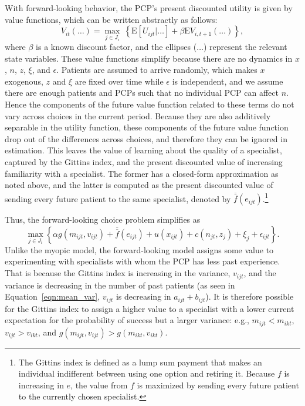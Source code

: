 \documentclass[12pt]{article}
\begin{document}
With forward-looking behavior, the PCP's present discounted utility is given by value functions, which can be written abstractly as follows:
\begin{equation*}
V_{it}(\dots) = \max_{j \in J_i} \ \left\{ \mathrm{E} \left[ U_{ijt} | \dots \right]
+ \beta \mathrm{E} V_{i, t+1}(\dots) \right\},
\end{equation*}
where $\beta$ is a known discount factor, and the ellipses ($\dots$) represent the relevant state variables. These value functions simplify because there are no dynamics in $x$, $n$, $z$, $\xi$, and $\epsilon$. Patients are assumed to arrive randomly, which makes $x$ exogenous, $z$ and $\xi$ are fixed over time while $\epsilon$ is independent, and we assume there are enough patients and PCPs such that no individual PCP can affect $n$. Hence the components of the future value function related to these terms do not vary across choices in the current period. Because they are also additively separable in the utility function, these components of the future value function drop out of the differences across choices, and therefore they can be ignored in estimation. This leaves the value of learning about the quality of a specialist, captured by the Gittins index, and the present discounted value of increasing familiarity with a specialist. The former has a closed-form approximation as noted above, and the latter is computed as the present discounted value of sending every future patient to the same specialist, denoted by $\overline{\overline{f}}(e_{ijt})$.\footnote{The Gittins index is defined as a lump sum payment that makes an individual indifferent between using one option and retiring it.  Because $f$ is increasing in $e$, the value from $f$ is maximized by sending every future patient to the currently chosen specialist.}

Thus, the forward-looking choice problem simplifies as
\begin{equation} 
\max_{j \in J_i} \left\{ \alpha g(m_{ijt}, v_{ijt}) + \overline{\overline{f}}(e_{ijt}) + u(x_{ijt}) + c(n_{jt}, z_j) + \xi_j + \epsilon_{ijt} \right\}.
\label{eqn:dynamic}
\end{equation}
Unlike the myopic model, the forward-looking model assigns some value to experimenting with specialists with whom the PCP has less past experience.
That is because the Gittins index is increasing in the variance, $v_{ijt}$, and the variance is decreasing in the number of past patients (as seen in Equation~\eqref{eqn:mean_var}, $v_{ijt}$ is decreasing in $a_{ijt} + b_{ijt}$). 
It is therefore possible for the Gittins index to assign a higher value to a specialist with a lower current expectation for the probability of success but a larger variance: e.g., $m_{ijt} < m_{ikt}$, $v_{ijt} > v_{ikt}$, and $g(m_{ijt}, v_{ijt}) > g(m_{ikt}, v_{ikt})$.
\end{document}
